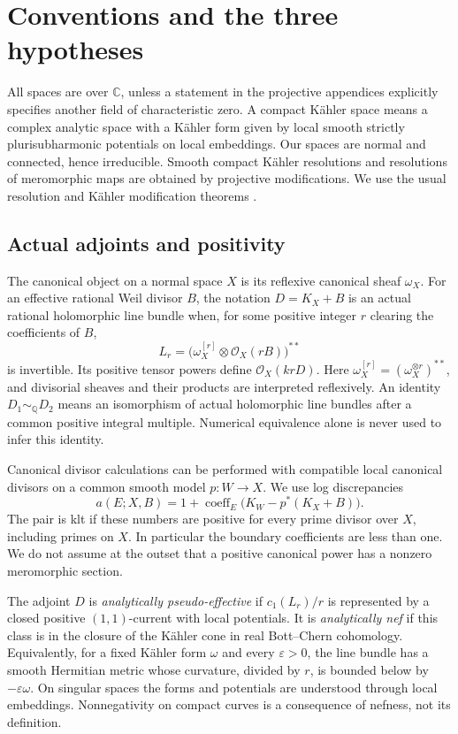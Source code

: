 \documentclass[11pt,letterpaper]{article}
\newcommand{\Q}{\mathbb{Q}}
\newcommand{\C}{\mathbb{C}}
\newcommand{\OO}{\mathcal{O}}
\theoremstyle{definition}
\theoremstyle{remark}
\begin{document}
\section{Conventions and the three hypotheses}\label{sec:premises}

All spaces are over \(\C\), unless a statement in the projective
appendices explicitly specifies another field of characteristic zero.
A compact K\"ahler space means a complex analytic space with a
K\"ahler form given by local smooth strictly plurisubharmonic potentials
on local embeddings. Our spaces are normal and connected, hence
irreducible. Smooth compact K\"ahler resolutions and resolutions of
meromorphic maps are obtained by projective modifications. We use the
usual resolution and K\"ahler modification theorems
\cite{HironakaResolution,VarouchasKahler}.

\subsection{Actual adjoints and positivity}

The canonical object on a normal space \(X\) is its reflexive canonical
sheaf \(\omega_X\). For an effective rational Weil divisor \(B\), the
notation \(D=K_X+B\) is an actual rational holomorphic line bundle
when, for some positive integer \(r\) clearing the coefficients of
\(B\),
\[
 L_r=\bigl(\omega_X^{[r]}\otimes\OO_X(rB)\bigr)^{**}
\]
is invertible. Its positive tensor powers define \(\OO_X(krD)\).
Here \(\omega_X^{[r]}=(\omega_X^{\otimes r})^{**}\), and divisorial
sheaves and their products are interpreted reflexively. An identity
\(D_1\sim_{\Q}D_2\) means an isomorphism of actual holomorphic line
bundles after a common positive integral multiple. Numerical equivalence
alone is never used to infer this identity.

Canonical divisor calculations can be performed with compatible local
canonical divisors on a common smooth model \(p:W\to X\). We use log
discrepancies
\begin{equation}\label{eq:discrepancy}
 a(E;X,B)=1+\operatorname{coeff}_E
       \bigl(K_W-p^*(K_X+B)\bigr).
\end{equation}
The pair is klt if these numbers are positive for every prime divisor
over \(X\), including primes on \(X\). In particular the boundary
coefficients are less than one. We do not assume at the outset that a
positive canonical power has a nonzero meromorphic section.

The adjoint \(D\) is \emph{analytically pseudo-effective} if
\(c_1(L_r)/r\) is represented by a closed positive \((1,1)\)-current
with local potentials. It is \emph{analytically nef} if this class is
in the closure of the K\"ahler cone in real Bott--Chern cohomology.
Equivalently, for a fixed K\"ahler form \(\omega\) and every
\(\varepsilon>0\), the line bundle has a smooth Hermitian metric
whose curvature, divided by \(r\), is bounded below by
\(-\varepsilon\omega\). On singular spaces the forms and potentials
are understood through local embeddings. Nonnegativity on compact
curves is a consequence of nefness, not its definition.
\end{document}
